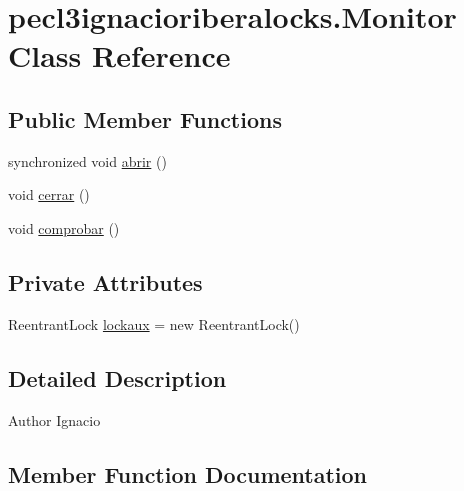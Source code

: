 \hypertarget{classpecl3ignacioriberalocks_1_1_monitor}{}\section{pecl3ignacioriberalocks.\+Monitor Class Reference}
\label{classpecl3ignacioriberalocks_1_1_monitor}
\subsection*{Public Member Functions}
\begin{DoxyCompactItemize}
\item 
synchronized void \mbox{\hyperlink{classpecl3ignacioriberalocks_1_1_monitor_a545e3f6a3c058b60d7d41a21af3c8d5c}{abrir}} ()
\item 
void \mbox{\hyperlink{classpecl3ignacioriberalocks_1_1_monitor_aa780ba5836e28e77615854afb0ad251d}{cerrar}} ()
\item 
void \mbox{\hyperlink{classpecl3ignacioriberalocks_1_1_monitor_a499e23011f3562a32a0587d74d6a0154}{comprobar}} ()
\end{DoxyCompactItemize}
\subsection*{Private Attributes}
\begin{DoxyCompactItemize}
\item 
Reentrant\+Lock \mbox{\hyperlink{classpecl3ignacioriberalocks_1_1_monitor_acde04bf90a7d9fc0ab9e3362f8c594bf}{lockaux}} = new Reentrant\+Lock()
\end{DoxyCompactItemize}


\subsection{Detailed Description}
\begin{DoxyAuthor}{Author}
Ignacio 
\end{DoxyAuthor}


\subsection{Member Function Documentation}
\mbox{\label{classpecl3ignacioriberalocks_1_1_monitor_a545e3f6a3c058b60d7d41a21af3c8d5c}} 
